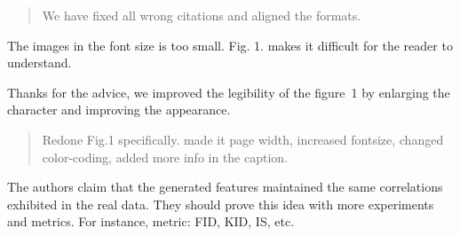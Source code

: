 \documentclass{article}
\begin{document}
\begin{quote}
	We have fixed all wrong citations and aligned the formats.
\end{quote}

\RC The images in the font size is too small. Fig. 1. makes it difficult for the reader to understand.

\AR Thanks for the advice, we improved the legibility of the figure~1 by enlarging the character and improving the appearance.

\begin{quote}
    Redone Fig.1 specifically. made it page width, increased fontsize, changed color-coding, added more info in the caption.
\end{quote}

\RC The authors claim that the generated features maintained the same correlations exhibited in the real data. They should prove this idea with more experiments and metrics. For instance, metric: FID, KID, IS, etc.
\end{document}
